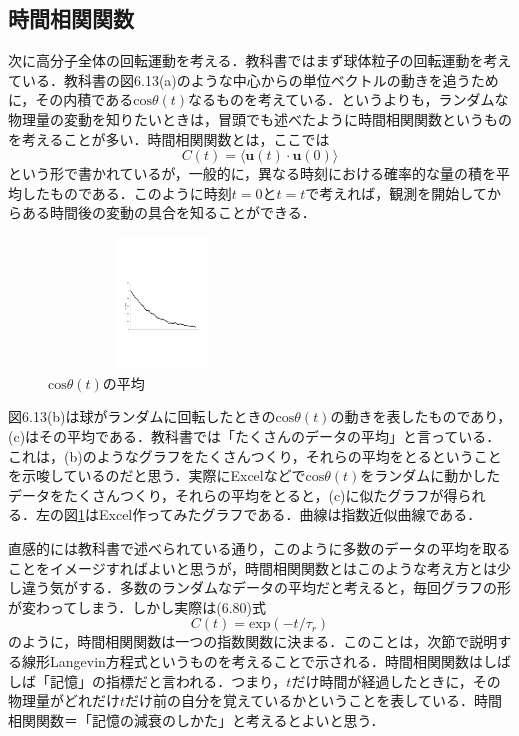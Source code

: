 \documentclass{jsarticle}
\begin{document}
\subsection{時間相関関数}
次に高分子全体の回転運動を考える．教科書ではまず球体粒子の回転運動を考えている．教科書の図6.13(a)のような中心からの単位ベクトルの動きを追うために，その内積である$\mathrm{cos}\theta (t)$なるものを考えている．というよりも，ランダムな物理量の変動を知りたいときは，冒頭でも述べたように時間相関関数というものを考えることが多い．時間相関関数とは，ここでは
\begin{equation}
C(t)=\langle \bm{u}(t)\cdot \bm{u}(0)\rangle
\end{equation}
という形で書かれているが，一般的に，異なる時刻における確率的な量の積を平均したものである．このように時刻$t=0$と$t=t$で考えれば，観測を開始してからある時間後の変動の具合を知ることができる．

\begin{figure}
  \vspace*{-\intextsep}
  \includegraphics[width=6cm,height=3.5cm]{s-cosの平均.pdf}
  \caption{$\mathrm{cos}\theta (t)$の平均}
  \label{fig.cosの平均}
\end{figure}
図6.13(b)は球がランダムに回転したときの$\mathrm{cos}\theta (t)$の動きを表したものであり，(c)はその平均である．教科書では「たくさんのデータの平均」と言っている．これは，(b)のようなグラフをたくさんつくり，それらの平均をとるということを示唆しているのだと思う．実際にExcelなどで$\mathrm{cos}\theta (t)$をランダムに動かしたデータをたくさんつくり，それらの平均をとると，(c)に似たグラフが得られる．左の図\ref{fig.cosの平均}はExcel作ってみたグラフである．曲線は指数近似曲線である．

直感的には教科書で述べられている通り，このように多数のデータの平均を取ることをイメージすればよいと思うが，時間相関関数とはこのような考え方とは少し違う気がする．多数のランダムなデータの平均だと考えると，毎回グラフの形が変わってしまう．しかし実際は(6.80)式
\begin{equation}
C(t)=\mathrm{exp}(-t/\tau _r)
\end{equation}
のように，時間相関関数は一つの指数関数に決まる．このことは，次節で説明する線形Langevin方程式というものを考えることで示される．時間相関関数はしばしば「記憶」の指標だと言われる．つまり，$t$だけ時間が経過したときに，その物理量がどれだけ$t$だけ前の自分を覚えているかということを表している．時間相関関数＝「記憶の減衰のしかた」と考えるとよいと思う．
\end{document}
